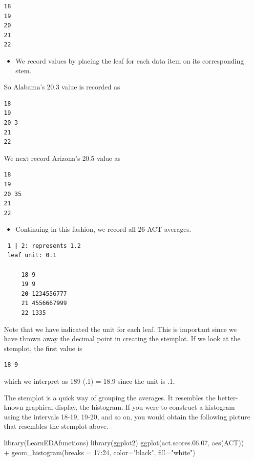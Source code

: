 \documentclass[
]{book}
\newenvironment{Shaded}{\begin{snugshade}}{\end{snugshade}}
\newcommand{\AttributeTok}[1]{\textcolor[rgb]{0.77,0.63,0.00}{#1}}
\newcommand{\DecValTok}[1]{\textcolor[rgb]{0.00,0.00,0.81}{#1}}
\newcommand{\FloatTok}[1]{\textcolor[rgb]{0.00,0.00,0.81}{#1}}
\newcommand{\FunctionTok}[1]{\textcolor[rgb]{0.00,0.00,0.00}{#1}}
\newcommand{\NormalTok}[1]{#1}
\newcommand{\SpecialCharTok}[1]{\textcolor[rgb]{0.00,0.00,0.00}{#1}}
\newcommand{\StringTok}[1]{\textcolor[rgb]{0.31,0.60,0.02}{#1}}
\providecommand{\tightlist}{%
  \setlength{\itemsep}{0pt}\setlength{\parskip}{0pt}}
\begin{document}
\begin{verbatim}
18
19
20
21
22
\end{verbatim}

\begin{itemize}
\tightlist
\item
  We record values by placing the leaf for each data item on its corresponding stem.
\end{itemize}

So Alabama's 20.3 value is recorded as

\begin{verbatim}
18
19
20 3
21
22
\end{verbatim}

We next record Arizona's 20.5 value as

\begin{verbatim}
18
19
20 35
21
22
\end{verbatim}

\begin{itemize}
\tightlist
\item
  Continuing in this fashion, we record all 26 ACT averages.
\end{itemize}

\begin{verbatim}
 1 | 2: represents 1.2
 leaf unit: 0.1
           
     18 9
     19 9
     20 1234556777
     21 4556667999
     22 1335
\end{verbatim}

Note that we have indicated the unit for each leaf. This is important since we have thrown away the decimal point in creating the stemplot. If we look at the stemplot, the first value is

\begin{verbatim}
18 9
\end{verbatim}

which we interpret as 189 (.1) = 18.9 since the unit is .1.

The stemplot is a quick way of grouping the averages. It resembles the better-known graphical display, the histogram. If you were to construct a histogram using the intervals 18-19, 19-20, and so on, you would obtain the following picture that resembles the stemplot above.

\begin{Shaded}
\begin{Highlighting}[]
\FunctionTok{library}\NormalTok{(LearnEDAfunctions)}
\FunctionTok{library}\NormalTok{(ggplot2)}
\FunctionTok{ggplot}\NormalTok{(act.scores.}\FloatTok{06.07}\NormalTok{, }\FunctionTok{aes}\NormalTok{(ACT)) }\SpecialCharTok{+}
  \FunctionTok{geom\_histogram}\NormalTok{(}\AttributeTok{breaks =} \DecValTok{17}\SpecialCharTok{:}\DecValTok{24}\NormalTok{,}
                 \AttributeTok{color=}\StringTok{"black"}\NormalTok{, }\AttributeTok{fill=}\StringTok{"white"}\NormalTok{)}
\end{Highlighting}
\end{Shaded}
\end{document}
